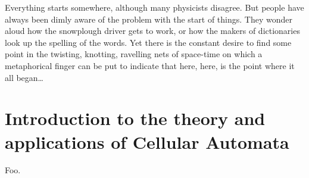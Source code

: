 
\begin{savequote}[99mm]
Everything starts somewhere, although many physicists disagree. But people have always been dimly aware of the problem with the start of things. They wonder aloud how the snowplough driver gets to work, or how the makers of dictionaries look up the spelling of the words. Yet there is the constant desire to find some point in the twisting, knotting, ravelling nets of space-time on which a metaphorical finger can be put to indicate that here, here, is the point where it all began\ldots
{}
\end{savequote}

\chapter{Introduction to the theory and applications of Cellular Automata}\label{chap:intro}

Foo.
